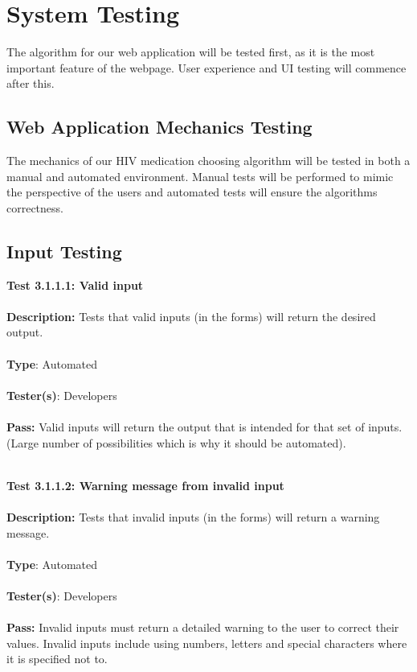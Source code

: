 \documentclass[12pt]{article}
\begin{document}
\section{System Testing}
The algorithm for our web application will be tested first, as it is the most important feature of the webpage. User experience and UI testing will commence after this.

\subsection{Web Application Mechanics Testing}
The mechanics of our HIV medication choosing algorithm will be tested in both a manual and automated environment. Manual tests will be performed to mimic the perspective of the users and automated tests will ensure the algorithm\textquotesingle s correctness.

\subsection{Input Testing}

\begin{tcolorbox}
\textbf{Test 3.1.1.1: Valid input} \\ \\
\textbf{Description:} Tests that valid inputs (in the forms) will return the desired output. \\ \\
\textbf{Type}: Automated \\ \\
\textbf{Tester(s)}: Developers \\ \\
\textbf{Pass:} Valid inputs will return the output that is intended for that set of inputs. (Large number of possibilities which is why it should be automated). \\ \\
\end{tcolorbox}

\begin{tcolorbox}
\textbf{Test 3.1.1.2: Warning message from invalid input} \\ \\
\textbf{Description:} Tests that invalid inputs (in the forms) will return a warning message. \\ \\
\textbf{Type}: Automated \\ \\
\textbf{Tester(s)}: Developers \\ \\
\textbf{Pass:} Invalid inputs must return a detailed warning to the user to correct their values. Invalid inputs include using numbers, letters and special characters where it is specified not to. \\ \\
\end{tcolorbox}
\end{document}
